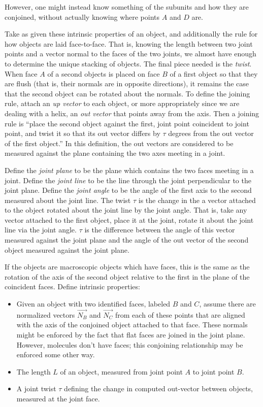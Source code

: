 \documentclass[11pt]{article}
\begin{document}
{However, one might instead know something of the subunits and
how they are conjoined, without actually knowing where points $A$
and $D$ are.

Take as given these intrinsic properties of an object, and additionally the
rule for how objects are laid face-to-face. That is, knowing the length between two
joint points and a vector normal to the faces of the two joints, we almost have
enough to determine the unique stacking of objects. The final piece
needed is
the {\em twist}. When face $A$ of a second objects is placed on face $B$
of a first object so that they are flush (that is, their normals are in opposite directions),
it remains the case that the second object can be rotated about the normals. To
define the joining rule, attach an {\em up vector} to each object, or more appropriately
since we are dealing with a helix, an {\em out vector} that points away from the axis.
Then a joining
rule is ``place the second object against the first, joint point coincident to joint point,
and twist it so that its out vector differs by $\tau$ degrees from the out vector of the first
object.'' In this definition, the out vectors are considered to be measured against the plane
containing the two axes meeting in a joint.

Define the {\em joint plane} to be the plane which contains the two faces meeting in a joint.
Define the {\em joint line} to be the line through the joint perpendicular to the joint plane.
Define the {\em joint angle} to be the angle of the first axis to the second measured about
the joint line.
The twist $\tau$ is the change in the a vector attached to the object rotated about the joint
line by the joint angle. That is, take any vector attached to the first object, place it at
the joint, rotate it about the joint line via the joint angle. $\tau$ is the difference
between the angle of this vector measured against the joint plane and the angle of the
out vector of the second object measured against the joint plane.

If the objects are macroscopic objects which have faces, this is the same as the rotation
of the axis of the second object relative to the first in the plane of the coincident faces.
Define intrinsic properties:

\begin{itemize}
\item Given an object with two identified faces, labeled $B$ and $C$, assume there are normalized
  vectors $\overrightarrow{N_B}$ and $\overrightarrow{N_C}$
  from each of these points that are aligned with the axis of the conjoined object attached to
  that face. These normals might be enforced by the fact that flat faces are joined in the joint plane.
  However, molecules don't have faces; this conjoining relationship may be enforced some other way.
\item The length $L$ of an object, measured from joint point $A$ to joint point $B$.
\item A joint twist $\tau$ defining the change in computed out-vector between objects,
  measured at the joint face.
\end{itemize}

}
\end{document}
